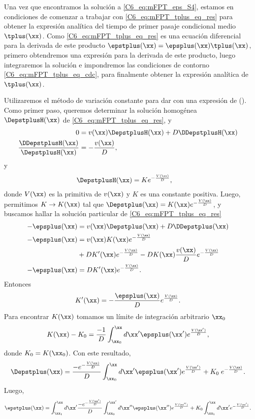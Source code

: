 {Una vez que encontramos la solución a \ref{C6_eq:mFPT_eps_S4}, estamos en condiciones de comenzar a trabajar con \ref{C6_eq:mFPT_tplus_eq_res} para obtener la expresión analítica del tiempo de primer pasaje condicional medio $\tplus(\xx)$. Como \ref{C6_eq:mFPT_tplus_eq_res} es una ecuación diferencial para la derivada de este producto $ \epstplus(\xx) = \epsplus(\xx) \tplus(\xx) $,  primero obtendremos una expresión para la derivada de este producto, luego integraremos la solución e impondremos las condiciones de contorno \ref{C6_eq:mFPT_tplus_eq_cdc}, para finalmente obtener la expresión analítica de  $\tplus(\xx)$.


Utilizaremos el método de variación constante para dar con una expresión de \Depstplus(\xx). Como primer paso, queremos determinar la solución homogénea $\DepstplusH(\xx)$ de \ref{C6_eq:mFPT_tplus_eq_res}, y
\begin{align}
    0 &= v(\xx) \DepstplusH(\xx)  + D \DDepstplusH(\xx)\\
    \frac{\DDepstplusH(\xx)}{\DepstplusH(\xx)} &= - \frac{v(\xx)}{D}, 
\end{align}
y
\begin{align}
   \DepstplusH(\xx) & = K  e^{- \frac{V(\xx)}{D}},
\end{align}
donde $V(\xx)$ es la primitiva de $v(\xx)$ y $K$ es una constante positiva.
Luego, permitimos $K \rightarrow   K(\xx)$ tal que $\Depstplus(\xx) = K(\xx) e^{- \frac{V(\xx)}{D}}$, y buscamos hallar la solución particular de \ref{C6_eq:mFPT_tplus_eq_res}
\begin{align}
    - \epsplus(\xx) &= v(\xx) \Depstplus(\xx) + D \DDepstplus(\xx)\\
    - \epsplus(\xx) &= v(\xx) K(\xx) e^{- \frac{V(\xx)}{D}}  \nonumber \\
    & + D K'(\xx)e^{- \frac{V(\xx)}{D}} - D K(\xx) \frac{v(\xx)}{D} e^{- \frac{V(\xx)}{D}} \\
    - \epsplus(\xx) &=  D K'(\xx)e^{- \frac{V(\xx)}{D}} .
\end{align}
Entonces
\begin{align}
         K'(\xx) = - \frac{\epsplus(\xx)}{D} e^{ \frac{V(\xx)}{D}} .
\end{align}
Para encontrar $K(\xx)$ tomamos un límite de integración arbitrario $\xx_{0}$
\begin{align}
         K(\xx) - K_0 = \frac{-1}{D} \int_{\xx_0}^\xx d\xx' \epsplus(\xx') e^{ \frac{V(\xx')}{D}},
\end{align}
donde $K_0 = K(\xx_0)$. Con este resultado, 
\begin{align}
    \Depstplus(\xx) = \frac{-e^{- \frac{V(\xx)}{D}}}{D} \int_{\xx_0}^\xx d\xx' \epsplus(\xx') e^{ \frac{V(\xx')}{D}} + K_0 \; e^{- \frac{V(\xx)}{D}} .
\end{align}
Luego, 
\begin{align}
   \epstplus(\xx) = \int_{\xx_1}^{\xx} d\xx'  \frac{- e^{- \frac{V(\xx')}{D}} }{D} \int_{\xx_0}^{\xx'} d \xx'' \epsplus(\xx'') e^{ \frac{V(\xx'')}{D}} + K_0 \int_{\xx_1}^{\xx} d\xx'  e^{- \frac{V(\xx')}{D}}  .
\end{align}


}
